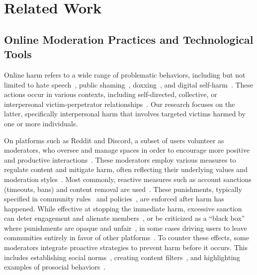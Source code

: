 \section{Related Work}
\subsection{Online Moderation Practices and Technological Tools}
Online harm refers to a wide range of problematic behaviors, including but not limited to hate speech~\cite{Mathew2020}, public shaming~\cite{Basak2016}, doxxing~\cite{Snyder2017}, and digital self-harm~\cite{Pater2017}. These actions occur in various contexts, including self-directed, collective, or interpersonal victim-perpetrator relationships~\cite{Krug2002}. Our research focuses on the latter, specifically interpersonal harm that involves targeted victims harmed by one or more individuals. 

On platforms such as Reddit and Discord, a subset of users volunteer as moderators, who oversee and manage spaces in order to encourage more positive and productive interactions~\cite{Seering2019}. %
These moderators employ various measures to regulate content and mitigate harm, often reflecting their underlying values and moderation styles~\cite{Jiang2023}. Most commonly, reactive measures such as account sanctions (timeouts, bans) and content removal are used~\cite{Srinivasan2019, Gillespie2018, Roberts2019}. These punishments, typically specified in community rules~\cite{Fiesler2018} and policies~\cite{Schaffner2024}, are enforced after harm has happened. While effective at stopping the immediate harm, excessive sanction can deter engagement and alienate members~\cite{Squirrell2019}, or be criticized as a ``black box'' where punishments are opaque and unfair~\cite{Kou2021, Vaccaro2020}, in some cases driving users to leave communities entirely in favor of other platforms~\cite{Gao2024}. To counter these effects, some moderators integrate proactive strategies to prevent harm before it occurs. This includes establishing social norms~\cite{Seering2019, Chandrasekharan2018}, creating content filters~\cite{Jhaver2019}, and highlighting examples of prosocial behaviors~\cite{Seering2017}. 

